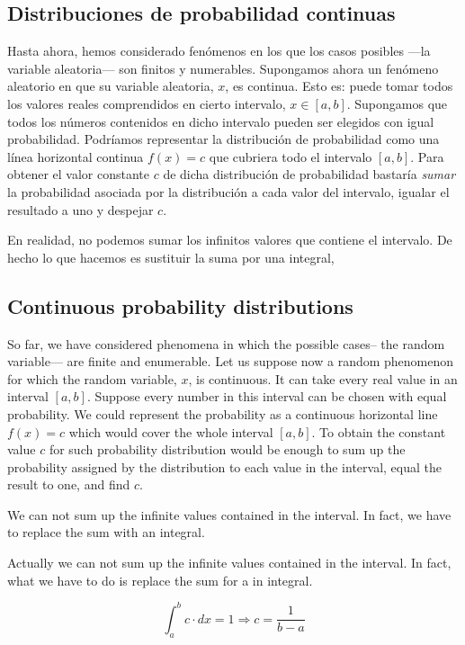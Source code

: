 \begin{paracol}{2}
\subsection{Distribuciones de probabilidad continuas}\label{pdfc}
Hasta ahora, hemos considerado fenómenos en los que los casos posibles ---la variable aleatoria--- son finitos y numerables. Supongamos ahora un fenómeno aleatorio en que su variable aleatoria, $x$, es continua. Esto es: puede tomar todos los valores reales comprendidos en cierto intervalo, $x \in [a,b]$. Supongamos que todos los números contenidos en dicho intervalo pueden ser elegidos con igual probabilidad. Podríamos representar la distribución de probabilidad como una línea horizontal continua $f(x) = c$ que cubriera todo el intervalo $[a,b]$. Para obtener el valor constante $c$ de dicha distribución de probabilidad bastaría \emph{sumar} la probabilidad asociada por la distribución a cada valor del intervalo, igualar el resultado a uno y despejar $c$.

En realidad, no podemos sumar los infinitos valores que contiene el intervalo. De hecho lo que hacemos es sustituir la suma por una integral,
\switchcolumn
\subsection{Continuous probability distributions}
So far, we have considered phenomena in which the possible cases-- the random variable--- are finite and enumerable. Let us suppose now a random phenomenon for which the random variable, $x$, is continuous. It can take every real value in an interval $[a,b]$. Suppose every number in this interval can be chosen with equal probability. We could represent the probability as a continuous horizontal line $f(x) =c$ which would cover the whole interval $[a,b]$. To obtain the constant value $c$ for such probability distribution would be enough to sum up the probability assigned by the distribution to each value in the interval, equal the result to one, and find $c$.

We can not sum up the infinite values contained in the interval. In fact, we have to replace the sum with an integral.

Actually we can not sum up the infinite values contained in the interval. In fact, what we have to do is replace the sum for a in integral.
\end{paracol}
\begin{equation*}
\int_a^b c\cdot dx = 1 \Rightarrow c = \frac{1}{b-a}
\end{equation*}


